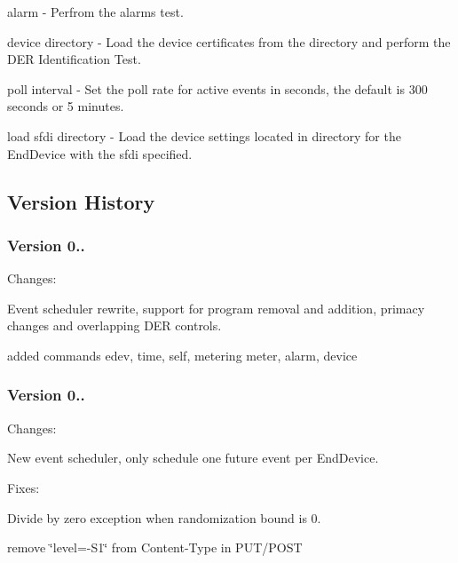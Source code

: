 \begin{DoxyItemize}
\item {\ttfamily alarm} -\/ Perfrom the alarms test.
\item {\ttfamily device directory} -\/ Load the device certificates from the directory and perform the D\+ER Identification Test.
\item {\ttfamily poll interval} -\/ Set the poll rate for active events in seconds, the default is 300 seconds or 5 minutes.
\item {\ttfamily load sfdi directory} -\/ Load the device settings located in {\ttfamily directory} for the End\+Device with the {\ttfamily sfdi} specified.
\end{DoxyItemize}

\subsection*{Version History }

\subsubsection*{Version 0..}

Changes\+:


\begin{DoxyItemize}
\item Event scheduler rewrite, support for program removal and addition, primacy changes and overlapping D\+ER controls.
\item added commands {\ttfamily edev}, {\ttfamily time}, {\ttfamily self}, {\ttfamily metering} {\ttfamily meter}, {\ttfamily alarm}, {\ttfamily device}
\end{DoxyItemize}

\subsubsection*{Version 0..}

Changes\+:


\begin{DoxyItemize}
\item New event scheduler, only schedule one future event per End\+Device.
\end{DoxyItemize}

Fixes\+:


\begin{DoxyItemize}
\item Divide by zero exception when randomization bound is 0.
\item remove \char`\"{}level=-\/\+S1\char`\"{} from Content-\/\+Type in P\+U\+T/\+P\+O\+ST
\end{DoxyItemize}

